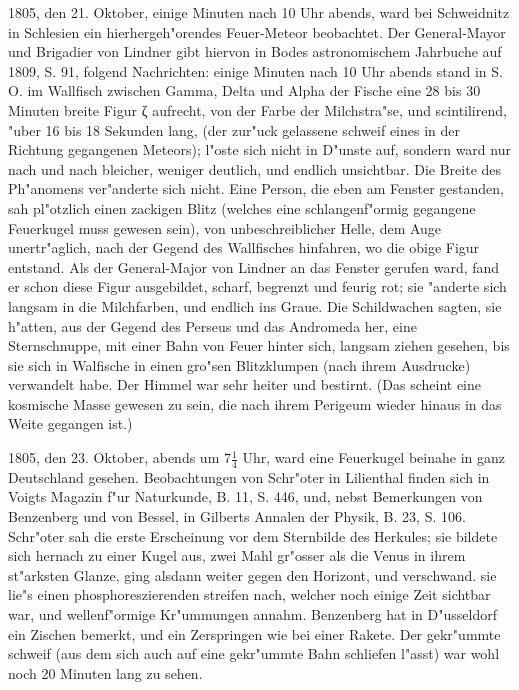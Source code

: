 \documentclass[a4paper, 11pt, oneside, polutonikogreek, german]{article}
\begin{document}
1805, den 21. Oktober, einige Minuten nach 10 Uhr abends, ward bei Schweidnitz in Schlesien ein hierhergeh"orendes Feuer-Meteor beobachtet. Der General-Mayor und Brigadier von Lindner gibt hiervon in Bodes astronomischem Jahrbuche auf 1809, S. 91, folgend Nachrichten: einige Minuten nach 10 Uhr abends stand in S. O. im Wallfisch zwischen Gamma, Delta und Alpha der Fische eine 28 bis 30 Minuten breite Figur ζ aufrecht, von der Farbe der Milchstra"se, und scintilirend, "uber 16 bis 18 Sekunden lang, (der zur"uck gelassene schweif eines in der Richtung gegangenen Meteors); l"oste sich nicht in D"unste auf, sondern ward nur nach und nach bleicher, weniger deutlich, und endlich unsichtbar. Die Breite des Ph"anomens ver"anderte sich nicht. Eine Person, die eben am Fenster gestanden, sah pl"otzlich einen zackigen Blitz (welches eine schlangenf"ormig gegangene Feuerkugel muss gewesen sein), von unbeschreiblicher Helle, dem Auge unertr"aglich, nach der Gegend des Wallfisches hinfahren, wo die obige Figur entstand. Als der General-Major von Lindner an das Fenster gerufen ward, fand er schon diese Figur ausgebildet, scharf, begrenzt und feurig rot; sie "anderte sich langsam in die Milchfarben, und endlich ins Graue. Die Schildwachen sagten, sie h"atten, aus der Gegend des Perseus und das Andromeda her, eine Sternschnuppe, mit einer Bahn von Feuer hinter sich, langsam ziehen gesehen, bis sie sich in Walfische in einen gro"sen Blitzklumpen (nach ihrem Ausdrucke) verwandelt habe. Der Himmel war sehr heiter und bestirnt. (Das scheint eine kosmische Masse gewesen zu sein, die nach ihrem Perigeum wieder hinaus in das Weite gegangen ist.)

1805, den 23. Oktober, abends um $\mathfrak{7\frac{1}{4}}$ Uhr, ward eine Feuerkugel beinahe in ganz Deutschland gesehen. Beobachtungen von Schr"oter in Lilienthal finden sich in Voigts Magazin f"ur Naturkunde, B. 11, S. 446, und, nebst Bemerkungen von Benzenberg und von Bessel, in Gilberts Annalen der Physik, B. 23, S. 106. Schr"oter sah die erste Erscheinung vor dem Sternbilde des Herkules; sie bildete sich hernach zu einer Kugel aus, zwei Mahl gr"osser als die Venus in ihrem st"arksten Glanze, ging alsdann weiter gegen den Horizont, und verschwand. sie lie"s einen phosphoreszierenden streifen nach, welcher noch einige Zeit sichtbar war, und wellenf"ormige Kr"ummungen annahm. Benzenberg hat in D"usseldorf ein Zischen bemerkt, und ein Zerspringen wie bei einer Rakete. Der gekr"ummte schweif (aus dem sich auch auf eine gekr"ummte Bahn schliefen l"asst) war wohl noch 20 Minuten lang zu sehen.
\end{document}

